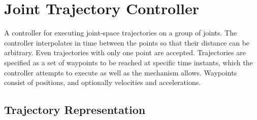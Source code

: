 \section{Joint Trajectory Controller}

A controller for executing joint-space trajectories on a group of joints.
The controller interpolates in time between the points so that their distance 
can be arbitrary. Even trajectories with only one point are accepted. 
Trajectories are specified as a set of waypoints to be reached at specific 
time instants, which the controller attempts to execute as well as the 
mechanism allows. Waypoints consist of positions, and optionally velocities 
and accelerations.\cite{ros2_joint_trajectory_controller}


\subsection{Trajectory Representation}